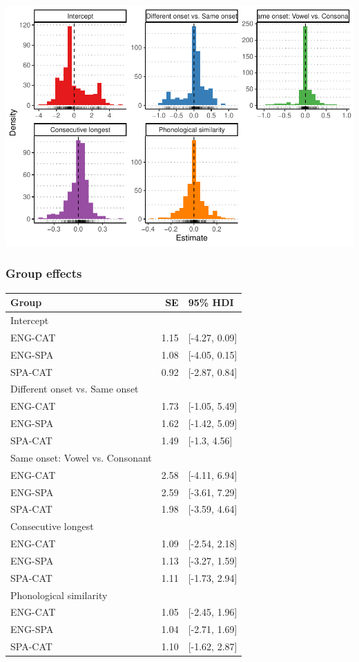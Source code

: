 \documentclass[
  english,
  man]{apa6}
\begin{document}
\includegraphics{te_manuscript_files/figure-latex/item_effects-1.pdf}

\hypertarget{group-effects}{%
\subsubsection{Group effects}\label{group-effects}}

\captionsetup[table]{labelformat=empty,skip=1pt}
\begin{longtable}{lrl}
\toprule
Group & SE & 95\% HDI \\ 
\midrule
\multicolumn{1}{l}{Intercept} \\ 
\midrule
ENG-CAT & 1.15 & [-4.27, 0.09] \\ 
ENG-SPA & 1.08 & [-4.05, 0.15] \\ 
SPA-CAT & 0.92 & [-2.87, 0.84] \\ 
\midrule
\multicolumn{1}{l}{Different onset vs. Same onset} \\ 
\midrule
ENG-CAT & 1.73 & [-1.05, 5.49] \\ 
ENG-SPA & 1.62 & [-1.42, 5.09] \\ 
SPA-CAT & 1.49 & [-1.3, 4.56] \\ 
\midrule
\multicolumn{1}{l}{Same onset: Vowel vs. Consonant} \\ 
\midrule
ENG-CAT & 2.58 & [-4.11, 6.94] \\ 
ENG-SPA & 2.59 & [-3.61, 7.29] \\ 
SPA-CAT & 1.98 & [-3.59, 4.64] \\ 
\midrule
\multicolumn{1}{l}{Consecutive longest} \\ 
\midrule
ENG-CAT & 1.09 & [-2.54, 2.18] \\ 
ENG-SPA & 1.13 & [-3.27, 1.59] \\ 
SPA-CAT & 1.11 & [-1.73, 2.94] \\ 
\midrule
\multicolumn{1}{l}{Phonological similarity} \\ 
\midrule
ENG-CAT & 1.05 & [-2.45, 1.96] \\ 
ENG-SPA & 1.04 & [-2.71, 1.69] \\ 
SPA-CAT & 1.10 & [-1.62, 2.87] \\ 
\bottomrule
\end{longtable}
\end{document}
